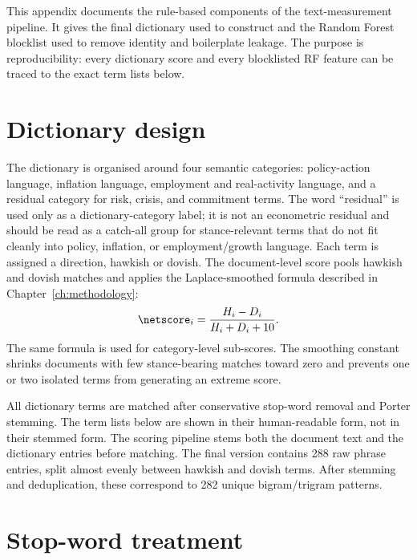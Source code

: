 
This appendix documents the rule-based components of the text-measurement
pipeline. It gives the final dictionary used to construct \netscore{} and the
Random Forest blocklist used to remove identity and boilerplate leakage. The
purpose is reproducibility: every dictionary score and every blocklisted RF
feature can be traced to the exact term lists below.

\section{Dictionary design}
\label{app:a1_dictionary_design}

The dictionary is organised around four semantic categories: policy-action
language, inflation language, employment and real-activity language, and a
residual category for risk, crisis, and commitment terms. The word ``residual''
is used only as a dictionary-category label; it is not an econometric residual
and should be read as a catch-all group for stance-relevant terms that do not
fit cleanly into policy, inflation, or employment/growth language. Each term is assigned
a direction, hawkish or dovish. The document-level score pools hawkish and
dovish matches and applies the Laplace-smoothed formula described in
Chapter~\ref{ch:methodology}:
\[
  \netscore_i = \frac{H_i-D_i}{H_i+D_i+10}.
\]
The same formula is used for category-level sub-scores. The smoothing constant
shrinks documents with few stance-bearing matches toward zero and prevents one
or two isolated terms from generating an extreme score.

All dictionary terms are matched after conservative stop-word removal and
Porter stemming. The term lists below are shown in their human-readable form,
not in their stemmed form. The scoring pipeline stems both the document text and
the dictionary entries before matching. The final version contains 288 raw phrase
entries, split almost evenly between hawkish and dovish terms. After stemming
and deduplication, these correspond to 282 unique bigram/trigram patterns.

\section{Stop-word treatment}
\label{app:a1_stopwords}

